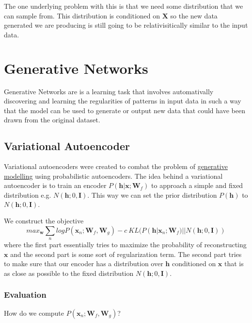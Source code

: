 \documentclass[12pt]{article}
\begin{document}
            The one underlying problem with this is that we need some distribution that we can sample from. This
            distribution is conditioned on $\boldsymbol{X}$ so the new data generated we are producing is still going to be
            relativisitically similar to the input data.

\section{Generative Networks}
    Generative Networks are is a learning task that involves automativally discovering and learning the regularities of
    patterns in input data in such a way that the model can be used to generate or output new data that could have been
    drawn from the original dataset.

    \subsection{Variational Autoencoder}
        Variational autoencoders were created to combat the problem of \hyperref[sec:ProbGenModel]{generative modelling}
        using probabilistic autoencoders. The idea behind a variational autoencoder is to train an encoder
        $P(\boldsymbol{h}|\boldsymbol{x}; \boldsymbol{W}_f)$ to approach a simple and fixed distribution e.g.
        $N(\boldsymbol{h}; 0, \boldsymbol{I})$. This way we can set the prior distribution $P(\boldsymbol{h})$ to $N(\boldsymbol{h};
        0, \boldsymbol{I})$.

        We construct the objective
        $$ max_{\boldsymbol{w}} \sum_{n} log P(\boldsymbol{x}_n; \boldsymbol{W}_f, \boldsymbol{W}_g) - c \:
        KL(P(\boldsymbol{h}|\boldsymbol{x}_n; \boldsymbol{W}_f) || N(\boldsymbol{h}; 0, \boldsymbol{I}))$$
        where the first part essentially tries to maximize the probability of reconstructing $\boldsymbol{x}$ and the
        second part is some sort of regularization term. The second part tries to make sure that our encoder has a
        distribution over $\boldsymbol{h}$ conditioned on $\boldsymbol{x}$ that is as close as possible to the fixed
        distribution $N(\boldsymbol{h}; 0, \boldsymbol{I})$. 

        \subsubsection{Evaluation}
            How do we compute $P(\boldsymbol{x}_n; \boldsymbol{W}_f, \boldsymbol{W}_g)$?
\end{document}

